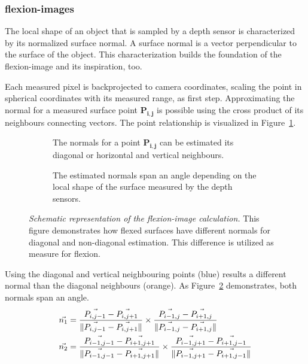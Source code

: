 \subsubsection{\Glspl{flexion-image}}\label{flexion-image-section}

The local shape of an object that is sampled by a depth sensor is characterized by its normalized surface normal.
A surface normal is a vector perpendicular to the surface of the object.
This characterization builds the foundation of the \Gls{flexion-image} and its inspiration, too.

Each measured pixel is backprojected to camera coordinates, scaling the point in spherical coordinates with its measured range, as first step.
Approximating the normal for a measured surface point $\mathbf{P_{i,j}}$ is possible using the cross product of its neighbours connecting vectors.
The point relationship is visualized in Figure~\ref{fig:flexion_normals_plane}.
\begin{figure}[H]
    \begin{subfigure}[t]{0.49\linewidth}
        \centering
        \scalebox{1.0}{%
        
        }
        \caption{The normals for a point $\mathbf{P_{i,j}}$ can be estimated its diagonal or horizontal and vertical neighbours.}\label{fig:flexion_normals_plane}
    \end{subfigure}
    \begin{subfigure}[t]{0.49\linewidth}
        \centering
        \scalebox{1.0}{%
        
        }
        \caption{The estimated normals span an angle depending on the local shape of the surface measured by the depth sensors.}\label{fig:flexion_space}
    \end{subfigure}
    \caption[Schematic representation of the \gls{flexion-image} calculation]{\emph{Schematic representation of the \gls{flexion-image} calculation.} This figure demonstrates how flexed surfaces have different normals for diagonal and non-diagonal estimation. This difference is utilized as measure for flexion.}%
    \label{fig:flexion-image-scetched}
\end{figure}
Using the diagonal and vertical neighbouring points (blue) results a different normal than the diagonal neighbours (orange).
As Figure~\ref{fig:flexion_space} demonstrates, both normals span an angle.
\begin{equation}
\begin{aligned}
    \vec{n_1} &= \frac{\vec{P_{i,j-1}} - \vec{P_{i,j+1}}}{\lVert\vec{P_{i,j-1}} - \vec{P_{i,j+1}}\rVert}
                \times \frac{\vec{P_{i-1,j}} - \vec{P_{i+1,j}}}{\lVert\vec{P_{i-1,j}} - \vec{P_{i+1,j}}\rVert} \\
    \vec{n_2} &= \frac{\vec{P_{i-1,j-1}} - \vec{P_{i+1,j+1}}}{\lVert\vec{P_{i-1,j-1}} - \vec{P_{i+1,j+1}}\rVert}
                \times \frac{\vec{P_{i-1,j+1}} - \vec{P_{i+1,j-1}}}{\lVert\vec{P_{i-1,j+1}} - \vec{P_{i+1,j-1}}\rVert}
    \label{eq:flexion_normals}
\end{aligned}
\end{equation}
